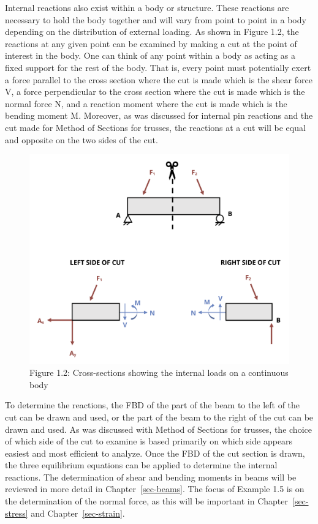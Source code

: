 \documentclass[
  letterpaper,
  DIV=11,
  numbers=noendperiod]{scrreprt}
\begin{document}
Internal reactions also exist within a body or structure. These
reactions are necessary to hold the body together and will vary from
point to point in a body depending on the distribution of external
loading. As shown in Figure 1.2, the reactions at any given point can be
examined by making a cut at the point of interest in the body. One can
think of any point within a body as acting as a fixed support for the
rest of the body. That is, every point must potentially exert a force
parallel to the cross section where the cut is made which is the shear
force V, a force perpendicular to the cross section where the cut is
made which is the normal force N, and a reaction moment where the cut is
made which is the bending moment M. Moreover, as was discussed for
internal pin reactions and the cut made for Method of Sections for
trusses, the reactions at a cut will be equal and opposite on the two
sides of the cut.

\begin{figure}[H]

{\centering \includegraphics[width=5.03125in,height=\textheight]{images/CH1 PNGs/figure 1.2.png}

}

\caption{Figure 1.2: Cross-sections showing the internal loads on a
continuous body}

\end{figure}%

To determine the reactions, the FBD of the part of the beam to the left
of the cut can be drawn and used, or the part of the beam to the right
of the cut can be drawn and used. As was discussed with Method of
Sections for trusses, the choice of which side of the cut to examine is
based primarily on which side appears easiest and most efficient to
analyze. Once the FBD of the cut section is drawn, the three equilibrium
equations can be applied to determine the internal reactions. The
determination of shear and bending moments in beams will be reviewed in
more detail in Chapter~\ref{sec-beams}. The focus of Example 1.5 is on
the determination of the normal force, as this will be important in
Chapter~\ref{sec-stress} and Chapter~\ref{sec-strain}.
\end{document}
